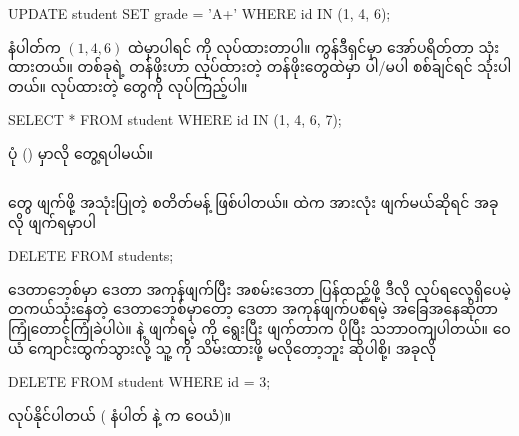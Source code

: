 %
\begin{sql}
UPDATE student SET grade = 'A+' WHERE id IN (1, 4, 6);
\end{sql}
%
 နံပါတ်က $(1,4,6)$ ထဲမှာပါရင်  ကို   လုပ်ထားတာပါ။  ကွန်ဒီရှင်မှာ   အော်ပရိတ်တာ သုံးထားတယ်။  တစ်ခုရဲ့ တန်ဖိုးဟာ  လုပ်ထားတဲ့ တန်ဖိုးတွေထဲမှာ ပါ/မပါ စစ်ချင်ရင်  သုံးပါတယ်။  လုပ်ထားတဲ့  တွေကို  လုပ်ကြည့်ပါ။ 
%
\begin{sql}
SELECT * FROM student WHERE id IN (1, 4, 6, 7);
\end{sql}
%
ပုံ (\fRefNo{\ref{fig:afterupdate}}) မှာလို တွေ့ရပါမယ်။

\begin{figure}[tbh!]
\caption{} 
\label{fig:afterupdate}
\end{figure}

\subsection*{}
 တွေ ဖျက်ဖို့ အသုံးပြုတဲ့ စတိတ်မန့် ဖြစ်ပါတယ်။  ထဲက  အားလုံး ဖျက်မယ်ဆိုရင် အခုလို ဖျက်ရမှာပါ
%
\begin{sql}
DELETE FROM students;
\end{sql}
%
 ဒေတာဘေ့စ်မှာ  ဒေတာ အကုန်ဖျက်ပြီး အစမ်းဒေတာ  ပြန်ထည့်ဖို့ ဒီလို လုပ်ရလေ့ရှိပေမဲ့ တကယ်သုံးနေတဲ့  ဒေတာဘေ့စ်မှာတော့  ဒေတာ အကုန်ဖျက်ပစ်ရမဲ့ အခြေအနေဆိုတာ ကြုံတောင့်ကြုံခဲပါပဲ။  နဲ့ ဖျက်ရမဲ့  ကို ရွေးပြီး ဖျက်တာက ပိုပြီး သဘာဝကျပါတယ်။ ဝေယံ ကျောင်းထွက်သွားလို့ သူ့  ကို သိမ်းထားဖို့ မလိုတော့ဘူး ဆိုပါစို့၊ အခုလို 
%
\begin{sql}
DELETE FROM student WHERE id = 3;
\end{sql}
%
 လုပ်နိုင်ပါတယ် ( နံပါတ်  နဲ့  က ဝေယံ)။


